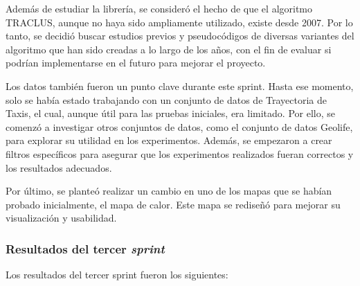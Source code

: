 Además de estudiar la librería, se consideró el hecho de que el algoritmo TRACLUS, aunque no haya sido ampliamente utilizado, existe desde 2007. Por lo tanto, se decidió buscar estudios previos y pseudocódigos de diversas variantes del algoritmo que han sido creadas a lo largo de los años, con el fin de evaluar si podrían implementarse en el futuro para mejorar el proyecto.

Los datos también fueron un punto clave durante este sprint. Hasta ese momento, solo se había estado trabajando con un conjunto de datos de Trayectoria de Taxis, el cual, aunque útil para las pruebas iniciales, era limitado. Por ello, se comenzó a investigar otros conjuntos de datos, como el conjunto de datos Geolife, para explorar su utilidad en los experimentos. Además, se empezaron a crear filtros específicos para asegurar que los experimentos realizados fueran correctos y los resultados adecuados.

Por último, se planteó realizar un cambio en uno de los mapas que se habían probado inicialmente, el mapa de calor. Este mapa se rediseñó para mejorar su visualización y usabilidad.

\subsubsection{Resultados del tercer \textit{sprint}}

Los resultados del tercer sprint fueron los siguientes:


